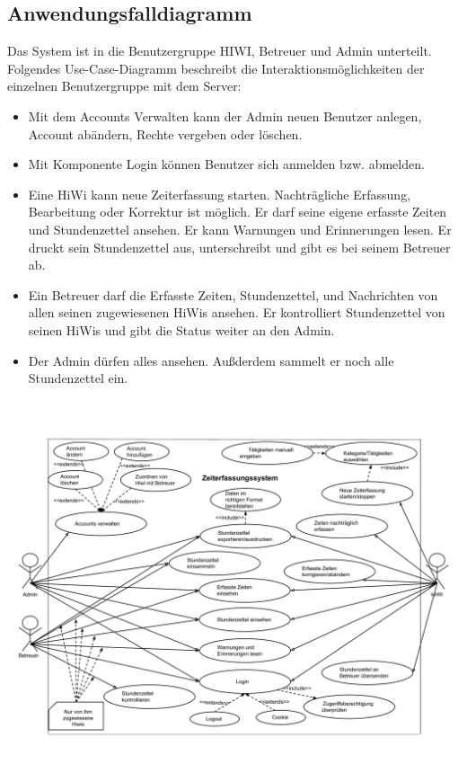 \newpage
\subsection{Anwendungsfalldiagramm}
Das System ist in die Benutzergruppe HIWI, Betreuer und Admin unterteilt. Folgendes Use-Case-Diagramm beschreibt die Interaktionsmöglichkeiten der einzelnen Benutzergruppe mit dem Server:
\begin{itemize}
	\item Mit dem Accounts Verwalten kann der Admin neuen Benutzer anlegen, Account abändern, Rechte vergeben oder löschen.
	\item Mit Komponente Login können Benutzer sich anmelden bzw. abmelden.
	\item Eine HiWi kann neue Zeiterfassung starten. Nachträgliche Erfassung, Bearbeitung oder Korrektur ist möglich. Er darf seine eigene erfasste Zeiten und Stundenzettel ansehen. Er kann Warnungen und Erinnerungen lesen. Er druckt sein Stundenzettel aus, unterschreibt und gibt es bei seinem Betreuer ab.
	\item Ein Betreuer darf die Erfasste Zeiten, Stundenzettel, und Nachrichten von allen seinen zugewiesenen HiWis ansehen. Er kontrolliert Stundenzettel von seinen HiWis und gibt die Status weiter an den Admin.
	\item Der Admin dürfen alles ansehen. Außderdem sammelt er noch alle Stundenzettel ein.
\end{itemize}\\


\includegraphics[width=\linewidth]{Anwendungsfalldiagramm.pdf}\\
